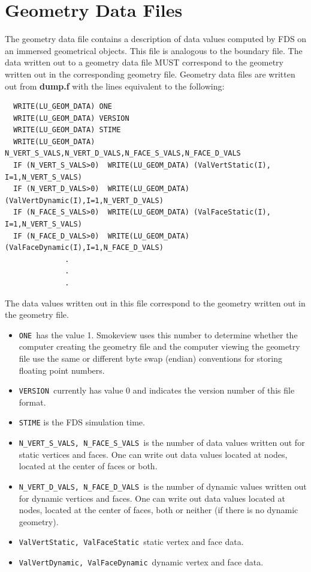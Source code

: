 \documentclass[11pt]{book}
\newcommand{\nopart}{\expandafter\def\csname Parent-1\endcsname{}} %
\newcommand{\ct}{\tt\small}
\begin{document}
\section{Geometry Data Files}
\label{out:GEOMETRY_DATA}

The geometry data file contains a description of data values computed by FDS on an immersed
geometrical objects.  This file is analogous to the boundary file.
The data written out to a geometry data file MUST correspond to the geometry written out
in the corresponding geometry file.
Geometry data files are written out from {\bf dump.f} with the lines equivalent to the following:

\scriptsize
\begin{verbatim}
  WRITE(LU_GEOM_DATA) ONE
  WRITE(LU_GEOM_DATA) VERSION
  WRITE(LU_GEOM_DATA) STIME
  WRITE(LU_GEOM_DATA) N_VERT_S_VALS,N_VERT_D_VALS,N_FACE_S_VALS,N_FACE_D_VALS
  IF (N_VERT_S_VALS>0)  WRITE(LU_GEOM_DATA) (ValVertStatic(I), I=1,N_VERT_S_VALS)
  IF (N_VERT_D_VALS>0)  WRITE(LU_GEOM_DATA) (ValVertDynamic(I),I=1,N_VERT_D_VALS)
  IF (N_FACE_S_VALS>0)  WRITE(LU_GEOM_DATA) (ValFaceStatic(I), I=1,N_VERT_S_VALS)
  IF (N_FACE_D_VALS>0)  WRITE(LU_GEOM_DATA) (ValFaceDynamic(I),I=1,N_FACE_D_VALS)
              .
              .
              .
\end{verbatim}
The data values written out in this file correspond to the geometry written out in the geometry file.
\normalsize
\begin{itemize}
\item {\ct ONE}\ has the value 1.
Smokeview uses this number to
determine whether the computer creating the geometry file and the
computer viewing the geometry file use the same or different byte
swap (endian) conventions for storing floating point numbers.
\item {\ct VERSION}\ currently has value 0 and indicates the version number of this file format.
\item {\ct STIME} is the FDS simulation time.
\item {\ct N\_VERT\_S\_VALS, N\_FACE\_S\_VALS}\ is the number of data values written out for static vertices and faces.  One can write out data values located at nodes, located at the center of faces or both.
\item {\ct N\_VERT\_D\_VALS, N\_FACE\_D\_VALS}\ is the number of dynamic values written out for dynamic vertices and faces.  One can write out
data values located at nodes, located at the center of faces, both or neither (if there is no dynamic geometry).
\item {\ct ValVertStatic, ValFaceStatic}\ static vertex and face data.
\item {\ct ValVertDynamic, ValFaceDynamic}\ dynamic
 vertex and face data.
\end{itemize}



\backmatter
\nopart %


\end{document}
